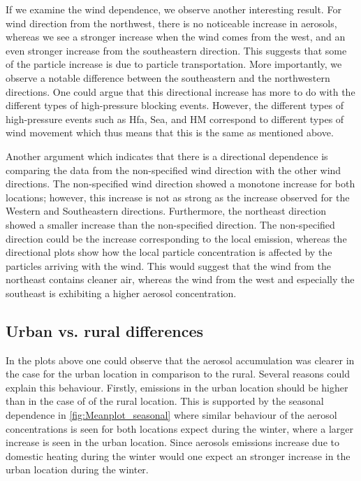 If we examine the wind dependence, we observe another interesting result. For wind direction from the northwest, there is no noticeable increase in aerosols, whereas we see a stronger increase when the wind comes from the west, and an even stronger increase from the southeastern direction. This suggests that some of the particle increase is due to particle transportation. More importantly, we observe a notable difference between the southeastern and the northwestern directions. One could argue that this directional increase has more to do with the different types of high-pressure blocking events. However, the different types of high-pressure events such as Hfa, Sea, and HM correspond to different types of wind movement which thus means that this is the same as mentioned above. 

Another argument which indicates that there is a directional dependence is comparing the data from the non-specified wind direction with the other wind directions. The non-specified wind direction showed a monotone increase for both locations; however, this increase is not as strong as the increase observed for the Western and Southeastern directions. Furthermore, the northeast direction showed a smaller increase than the non-specified direction. The non-specified direction could be the increase corresponding to the local emission, whereas the directional plots show how the local particle concentration is affected by the particles arriving with the wind. This would suggest that the wind from the northeast contains cleaner air, whereas the wind from the west and especially the southeast is exhibiting a higher aerosol concentration.


\subsection{Urban vs. rural differences}
In the plots above one could observe that the aerosol accumulation was clearer in the case for the urban location in comparison to the rural. Several reasons could explain this behaviour. Firstly, emissions in the urban location  should be higher than in the case of of the rural location. This is supported by the seasonal dependence in \autoref{fig:Meanplot_seasonal} where similar behaviour of the aerosol concentrations is seen for both locations expect during the winter, where a larger increase is seen in the urban location. Since aerosols emissions increase due to domestic heating during the winter would one expect an stronger increase in the urban location during the winter. 

